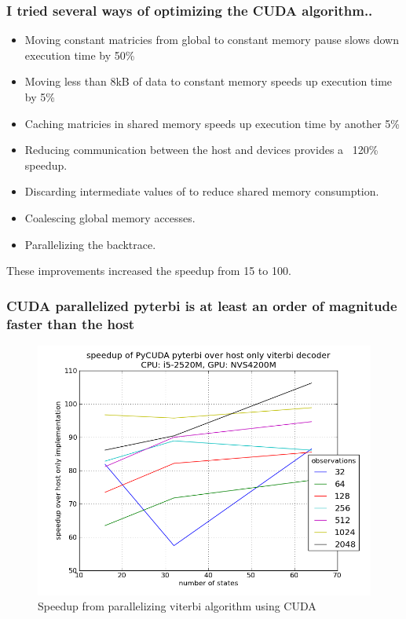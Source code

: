 \documentclass{beamer}
\begin{document}
    \begin{frame}
    \frametitle{I tried several ways of optimizing the CUDA algorithm..}
    \begin{itemize}
        \item Moving constant matricies from global to constant memory pause slows down execution time by 50\%
        \item Moving less than 8kB of data to constant memory speeds up execution time by 5\%
        \item Caching matricies in shared memory speeds up execution time by another 5\%
        \item Reducing communication between the host and devices provides a ~120\% speedup.
        \item Discarding intermediate values of to reduce shared memory consumption.
        \item Coalescing global memory accesses.
        \item Parallelizing the backtrace.
    \end{itemize}
    These improvements increased the speedup from 15 to 100.
    \end{frame}

    \begin{frame}
        \frametitle{CUDA parallelized pyterbi is at least an order of magnitude faster than the host}
        \begin{figure}
            \includegraphics[width=.8\textwidth]{figures/speedupgraphcuda.png}
            \caption{Speedup from parallelizing viterbi algorithm using CUDA}
        \end{figure}

    \end{frame}
 
\end{document}
